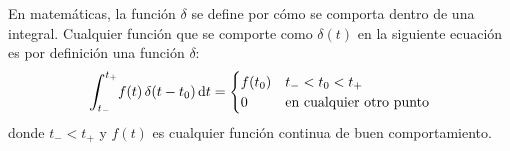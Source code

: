 \documentclass[12pt]{article}
\def\scaleint#1{\vcenter{\hbox{\scaleto[3ex]{\displaystyle\int}{#1}}}}
\def\bs{\mkern-12mu}
\numberwithin{equation}{section}
\begin{document}
En matemáticas, la función $\delta$ se define por cómo se comporta dentro de una integral. Cualquier función que se comporte como $\delta (t)$ en la siguiente ecuación es por definición una función $\delta$:
\begin{align}
\scaleint{6ex}_{\bs t_{-}}^{t_{+}} f (t) \, \delta(t - t_{0}) \dd{t} = \begin{cases}
f (t_{0}) & t_{-} < t_{0}  < t_{+} \\
0 & \mbox{en cualquier otro punto}
\end{cases}
\label{eq:ecuacion_05_14}
\end{align}
donde $t_{-} < t_{+}$ y $f (t)$ es cualquier función continua de buen comportamiento.

\end{document}
